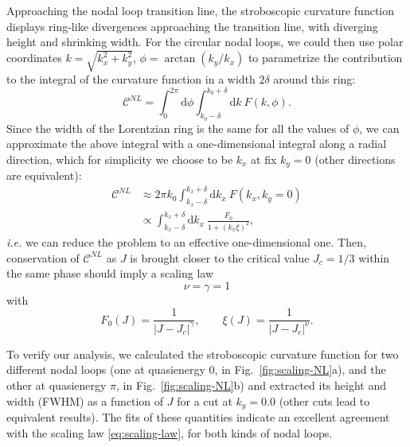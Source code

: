 \documentclass[aps,prb,twocolumn,superscriptaddress,groupedaddress]{revtex4}
\begin{document}
Approaching the nodal loop transition line, the stroboscopic curvature function displays ring-like divergences approaching the transition line, with diverging height and shrinking width.
For the circular nodal loops, we could then use polar coordinates $k = \sqrt{k_x^2 + k_y^2}$, $\phi = \arctan(k_y / k_x)$ to parametrize the contribution to the integral of the curvature function in a width $2\delta$ around this ring:
%
\begin{equation}
\mathcal{C}^{NL} = \int_{0}^{2\pi} \mathrm{d} \phi \int_{k_0 - \delta}^{k_0 + \delta} \mathrm{d}k \: F(k, \phi).
\end{equation}
%
Since the width of the Lorentzian ring is the same for all the values of $\phi$, we can approximate the above integral with a one-dimensional integral along a radial direction, which for simplicity we choose to be $k_x$ at fix $k_y=0$ (other directions are equivalent):
%
\begin{align}
\mathcal{C}^{NL} &\approx 2\pi k_0 \int_{k_x - \delta}^{k_x + \delta} \mathrm{d}k_x \: F(k_x, k_y=0) \nonumber \\
&\propto  \int_{k_x - \delta}^{k_x + \delta} \mathrm{d}k_x \: \frac{F_0}{1 + (k_x \xi)^2},
\end{align}
%
\textit{i.e.} we can reduce the problem to an effective one-dimensional one.
Then, conservation of $\mathcal{C}^{NL}$ as $J$ is brought closer to the critical value $J_c=1/3$ within the same phase should imply a scaling law
%
\begin{equation}
\nu = \gamma = 1
\label{eq:scaling-law}
\end{equation}
%
with
%
\begin{equation}
F_0(J) = \frac{1}{|J- J_c|^{\gamma}}, \qquad \xi(J) = \frac{1}{|J- J_c|^{\nu}}.
\end{equation}
%

To verify our analysis, we calculated the stroboscopic curvature function for two different nodal loops (one at quasienergy $0$, in Fig.~\ref{fig:scaling-NL}a), and the other at quasienergy $\pi$, in Fig.~\ref{fig:scaling-NL}b) and extracted its height and width (FWHM) as a function of $J$ for a cut at $k_y=0.0$ (other cuts lead to equivalent results).
The fits of these quantities indicate an excellent agreement with the scaling law \eqref{eq:scaling-law}, for both kinds of nodal loops.
\end{document}
